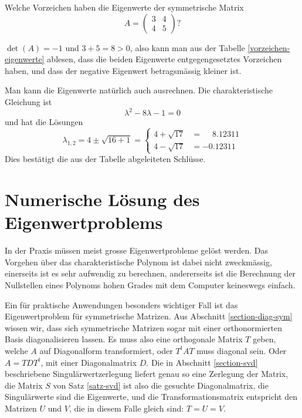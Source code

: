 \begin{beispiel}[Zahlenbeispiel]
Welche Vorzeichen haben die Eigenwerte der symmetrische Matrix
\[
A=\begin{pmatrix}
3&4\\
4&5
\end{pmatrix}?
\]

\smallskip
{\parindent 0pt $\det(A)=-1$ und $3+5=8>0$, also kann man aus der
Tabelle \ref{vorzeichen-eigenwerte}
ablesen, dass die beiden Eigenwerte entgegengesetztes
Vorzeichen haben, und dass der negative Eigenwert betragsmässig
kleiner ist.}

Man kann die Eigenwerte natürlich auch ausrechnen.
Die charakteristische Gleichung ist 
\[
\lambda^2-8\lambda-1=0
\]
und hat die Lösungen
\[
\lambda_{1,2}=4\pm\sqrt{16+1}=\begin{cases}
4+\sqrt{17}&=\phantom{-}8.12311\\
4-\sqrt{17}&=-0.12311
\end{cases}
\]
Dies bestätigt die aus der Tabelle abgeleiteten Schlüsse.
\end{beispiel}

\section{Numerische Lösung des Eigenwertproblems}
In der Praxis müssen meist grosse Eigenwertprobleme gelöst werden.
Das Vorgehen über das charakteristische Polynom ist dabei nicht zweckmässig,
einerseits ist es sehr aufwendig zu berechnen, andererseits ist die
Berechnung der Nullstellen eines Polynoms hohen Grades mit dem Computer
keineswegs einfach.

Ein für praktische Anwendungen besonders wichtiger Fall ist
das Eigenwertproblem für symmetrische Matrizen.
Aus Abschnitt \ref{section-diag-sym} wissen wir, dass sich symmetrische
Matrizen sogar mit einer orthonormierten Basis diagonalisieren lassen.
Es muss also eine orthogonale Matrix $T$ geben, welche $A$ auf
Diagonalform transformiert, oder $T^tAT$ muss diagonal sein.
Oder $A=TDT^t$, mit einer Diagonalmatrix $D$.
Die in Abschnitt \ref{section-svd} beschriebene Singulärwertzerlegung
liefert genau so eine Zerlegung der Matrix, die Matrix $S$ von 
Satz \ref{satz-svd} ist also die gesuchte Diagonalmatrix, die
Singulärwerte sind die Eigenwerte, und die Transformationsmatrix
entspricht den Matrizen $U$ und $V$, die in diesem Falle gleich sind:
$T=U=V$.

